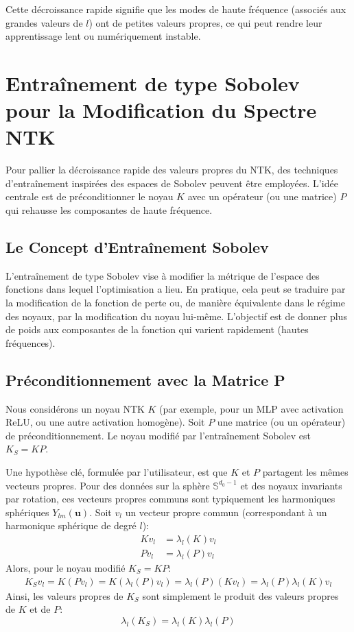 \documentclass{article}
\newcommand{\uu}{\mathbf{u}} %
\begin{document}
Cette décroissance rapide signifie que les modes de haute fréquence (associés aux grandes valeurs de $l$) ont de petites valeurs propres, ce qui peut rendre leur apprentissage lent ou numériquement instable.

\section{Entraînement de type Sobolev pour la Modification du Spectre NTK}

Pour pallier la décroissance rapide des valeurs propres du NTK, des techniques d'entraînement inspirées des espaces de Sobolev peuvent être employées. L'idée centrale est de préconditionner le noyau $K$ avec un opérateur (ou une matrice) $P$ qui rehausse les composantes de haute fréquence.

\subsection{Le Concept d'Entraînement Sobolev}
L'entraînement de type Sobolev vise à modifier la métrique de l'espace des fonctions dans lequel l'optimisation a lieu. En pratique, cela peut se traduire par la modification de la fonction de perte ou, de manière équivalente dans le régime des noyaux, par la modification du noyau lui-même. L'objectif est de donner plus de poids aux composantes de la fonction qui varient rapidement (hautes fréquences).

\subsection{Préconditionnement avec la Matrice P}
Nous considérons un noyau NTK $K$ (par exemple, pour un MLP avec activation ReLU, ou une autre activation homogène). Soit $P$ une matrice (ou un opérateur) de préconditionnement. Le noyau modifié par l'entraînement Sobolev est $K_S = KP$.

Une hypothèse clé, formulée par l'utilisateur, est que $K$ et $P$ partagent les mêmes vecteurs propres. Pour des données sur la sphère $\mathbb{S}^{d_0-1}$ et des noyaux invariants par rotation, ces vecteurs propres communs sont typiquement les harmoniques sphériques $Y_{lm}(\uu)$.
Soit $v_l$ un vecteur propre commun (correspondant à un harmonique sphérique de degré $l$):
\begin{align*}
    Kv_l &= \lambda_l(K) v_l \\
    Pv_l &= \lambda_l(P) v_l
\end{align*}
Alors, pour le noyau modifié $K_S = KP$:
\begin{align*}
    K_S v_l = K(Pv_l) = K(\lambda_l(P)v_l) = \lambda_l(P) (Kv_l) = \lambda_l(P) \lambda_l(K) v_l
\end{align*}
Ainsi, les valeurs propres de $K_S$ sont simplement le produit des valeurs propres de $K$ et de $P$:
\begin{equation}
    \lambda_l(K_S) = \lambda_l(K) \lambda_l(P)
    \label{eq:eigen_prod}
\end{equation}
\end{document}
